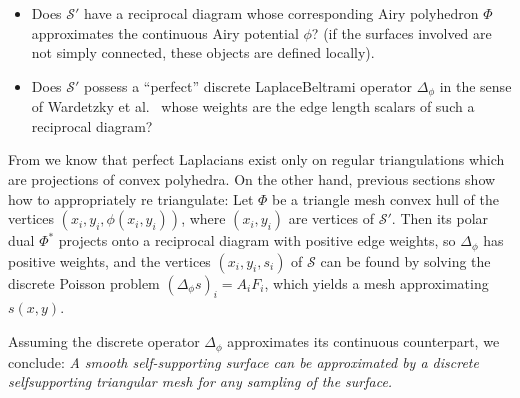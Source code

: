 \documentclass[review]{acmsiggraph}
\def\SS{{\mathcal S}}
\begin{document}
\begin{itemize}\itemsep-\parsep

\item Does $\SS'$ have a reciprocal diagram whose corresponding Airy 
polyhedron $\Phi$ approximates the continuous Airy potential $\phi$? (if 
the surfaces involved are not simply connected, these objects are defined 
locally).

\item Does $\SS'$ possess a ``perfect'' discrete Laplace\dash Beltrami 
operator $\Delta_\phi$ in the sense of Wardetzky et 
al.~ whose weights are the edge length scalars of 
such a reciprocal diagram?

\end{itemize}

From \cite{wardetzky07} we know that perfect Laplacians exist only on 
regular triangulations which are projections of convex polyhedra. On the 
other hand, previous sections show how to appropriately re\dash 
triangulate: Let $\Phi$ be a triangle mesh convex hull of the vertices 
$(x_i,y_i,\phi(x_i,y_i))$, where $(x_i,y_i)$ are vertices of $\SS'$. Then 
its polar dual $\Phi^*$ projects onto a reciprocal diagram with positive 
edge weights, so $\Delta_\phi$ has positive weights, and the vertices 
$(x_i,y_i,s_i)$ of $\SS$ can be found by solving the discrete Poisson 
problem $(\Delta_\phi s)_i=A_iF_i$, which yields a mesh approximating 
$s(x,y)$.

Assuming the discrete operator $\Delta_\phi$ approximates its continuous 
counterpart, we conclude: {\it A smooth self-supporting surface can be 
approximated by a discrete self\dash supporting triangular mesh for any 
sampling of the surface.}
\end{document}

